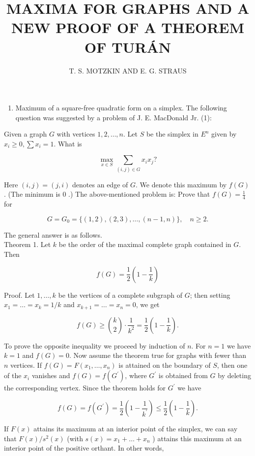 \documentclass[10pt]{article}
\title{MAXIMA FOR GRAPHS AND A NEW PROOF OF A THEOREM OF TURÁN }
\author{T. S. MOTZKIN AND E. G. STRAUS}
\date{}
\begin{document}
\maketitle


\begin{enumerate}
  \item Maximum of a square-free quadratic form on a simplex. The following question was suggested by a problem of J. E. MacDonald Jr. (1):
\end{enumerate}

Given a graph \(G\) with vertices \(1,2, \ldots, n\). Let \(S\) be the simplex in \(E^{n}\) given by \(x_{i} \geqslant 0, \sum x_{i}=1\). What is

\[
\max _{x \in S} \sum_{(i, j) \in G} x_{i} x_{j} ?
\]

Here \((i, j)=(j, i)\) denotes an edge of \(G\). We denote this maximum by \(f(G)\). (The minimum is 0 .) The above-mentioned problem is: Prove that \(f(G)=\frac{1}{4}\) for

\[
G=G_{0}=\{(1,2),(2,3), \ldots,(n-1, n)\}, \quad n \geqslant 2 .
\]

The general answer is as follows.\\
Theorem 1. Let \(k\) be the order of the maximal complete graph contained in \(G\). Then

\[
f(G)=\frac{1}{2}\left(1-\frac{1}{k}\right)
\]

Proof. Let \(1, \ldots, k\) be the vertices of a complete subgraph of \(G\); then setting \(x_{1}=\ldots=x_{k}=1 / k\) and \(x_{k+1}=\ldots=x_{n}=0\), we get

\[
f(G) \geqslant\binom{ k}{2} \cdot \frac{1}{k^{2}}=\frac{1}{2}\left(1-\frac{1}{k}\right) .
\]

To prove the opposite inequality we proceed by induction of \(n\). For \(n=1\) we have \(k=1\) and \(f(G)=0\). Now assume the theorem true for graphs with fewer than \(n\) vertices. If \(f(G)=F\left(x_{1}, \ldots, x_{n}\right)\) is attained on the boundary of \(S\), then one of the \(x_{i}\) vanishes and \(f(G)=f\left(G^{\prime}\right)\), where \(G^{\prime}\) is obtained from \(G\) by deleting the corresponding vertex. Since the theorem holds for \(G^{\prime}\) we have

\[
f(G)=f\left(G^{\prime}\right)=\frac{1}{2}\left(1-\frac{1}{k^{\prime}}\right) \leqslant \frac{1}{2}\left(1-\frac{1}{k}\right) .
\]

If \(F(x)\) attains its maximum at an interior point of the simplex, we can say that \(F(x) / s^{2}(x)\) (with \(s(x)=x_{1}+\ldots+x_{n}\) ) attains this maximum at an interior point of the positive orthant. In other words,
\end{document}
